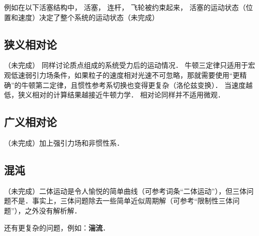 例如在以下活塞结构中， 活塞， 连杆， 飞轮被约束起来， 活塞的运动状态（位置和速度）决定了整个系统的运动状态（未完成）%

\subsection{狭义相对论}
（未完成）
同样讨论质点组成的系统受力后的运动情况． 牛顿三定律只适用于宏观低速弱引力场条件，如果粒子的速度相对光速不可忽略，那就需要使用“更精确”的牛顿第二定律，且惯性参考系切换也变得更复杂（洛伦兹变换）． 当速度越低，狭义相对的计算结果越接近牛顿力学． 相对论同样并不适用微观．

\subsection{广义相对论}
（未完成）加上强引力场和非惯性系．
\subsection{混沌}
（未完成）二体运动是令人愉悦的简单曲线（可参考词条“二体运动”），但三体问题不是．事实上，三体问题除去一些简单近似周期解（可参考“限制性三体问题”），之外没有解析解．

还有更复杂的问题，例如：\textbf{湍流}．